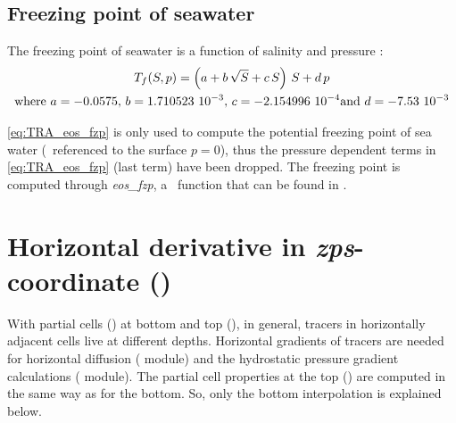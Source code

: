 \documentclass[../main/NEMO_manual]{subfiles}
\begin{document}
\subsection{Freezing point of seawater}
\label{subsec:TRA_fzp}

The freezing point of seawater is a function of salinity and pressure \citep{fofonoff.millard_bk83}:
\begin{equation}
  \label{eq:TRA_eos_fzp}
  \begin{gathered}
    T_f (S,p) = \left( a + b \, \sqrt{S} + c \, S \right) \, S + d \, p \\
    \text{where~} a = -0.0575, \, b = 1.710523~10^{-3}, \, c = -2.154996~10^{-4} \text{and~} d = -7.53~10^{-3}
    \end{gathered}
\end{equation}

\autoref{eq:TRA_eos_fzp} is only used to compute the potential freezing point of sea water
(\ie\ referenced to the surface $p = 0$),
thus the pressure dependent terms in \autoref{eq:TRA_eos_fzp} (last term) have been dropped.
The freezing point is computed through \textit{eos\_fzp},
a \fortran\ function that can be found in .



\section[Horizontal derivative in \textit{zps}-coordinate (\textit{zpshde.F90})]{Horizontal derivative in \textit{zps}-coordinate (\protect{})}
\label{sec:TRA_zpshde}


With partial cells () at bottom and top
(),
in general, tracers in horizontally adjacent cells live at different depths.
Horizontal gradients of tracers are needed for horizontal diffusion
( module) and the hydrostatic pressure gradient calculations ( module).
The partial cell properties at the top () are computed in
the same way as for the bottom.
So, only the bottom interpolation is explained below.
\end{document}
